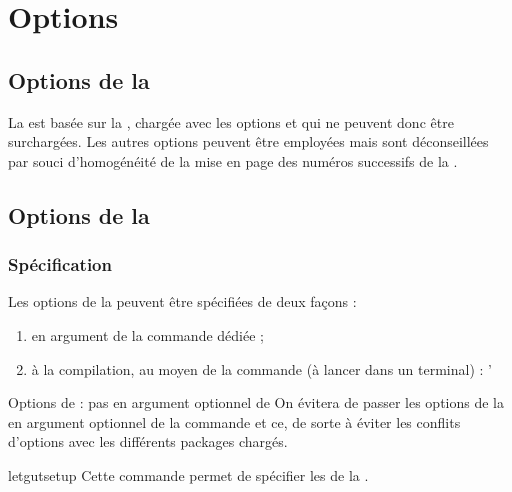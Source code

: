 \documentclass{letgut}
\begin{document}
\section{Options}
\label{sec:options}

\subsection{Options de la }
\label{sec:options-de-la}

La  est basée sur la , chargée avec les options
 et \docAuxKey{11pt} qui ne peuvent donc être
surchargées. Les autres options peuvent être employées mais sont déconseillées
par souci d'homogénéité de la mise en page des numéros successifs de la
.

\subsection{Options de la }
\label{sec:options-de-la}

\subsubsection{Spécification}
\label{sec:specification}

Les options de la  peuvent être spécifiées de deux façons :
\begin{enumerate}
\item en argument de la commande dédiée  ;
\item à la compilation, au moyen de la commande (à lancer dans un terminal) :
\begingroup
\lstset{basicstyle=\ttfamily\small}
'}{}
\endgroup
\end{enumerate}

\begin{dbwarning}{Options de  : pas en argument optionnel
    de }{}
  On évitera de passer les options de la  en argument optionnel de
  la commande  et ce, de sorte à éviter les
  conflits d'options avec les différents packages chargés.
\end{dbwarning}

\begin{docCommand}{letgutsetup}{}
  Cette commande permet de spécifier les  de la .
\end{docCommand}
\end{document}
